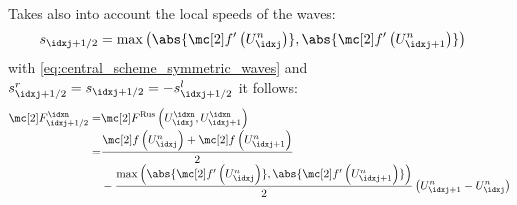\begin{defnbox}\nospacing
    \begin{defn}\label{defn:Rusanov_local_friedrichs_scheme}\leavevmode\\
        Takes also into account the local speeds of the waves:
        \begin{align}
          s_{\idxj+1/2}=\max \left(\abs{\flux'\left(U_{\idxj}^{n}\right)},\abs{\flux'\left(U_{\idxj+1}^{n}\right)}\right)&&
        \end{align}
        with \cref{eq:central_scheme_symmetric_waves} and $s_{\idxj+1/2}^{r}=s_{\idxj+1/2}=-s_{\idxj+1/2}^{l}$ it follows:
        \begin{align}
          \Flux_{\idxj+1/2}^{\idxn}=&\Flux^{\text{Rus}}\left(U^{\idxn}_{\idxj},U^{\idxn}_{\idxj+1}\right)\\[-1\jot]
                                   =&\frac{\flux\left(U_{\idxj}^{n}\right)+\flux \left(U_{\idxj+1}^{n}\right)}{2}\\[-1\jot]
          &-\frac{\max \left(\abs{\flux'\left(U_{\idxj}^{n}\right)},\abs{\flux'\left(U_{\idxj+1}^{n}\right)}\right)}{2}\left(U_{\idxj+1}^{n}-U_{\idxj}^{n}\right)\nonumber
        \end{align}
    \end{defn}
\end{defnbox}
